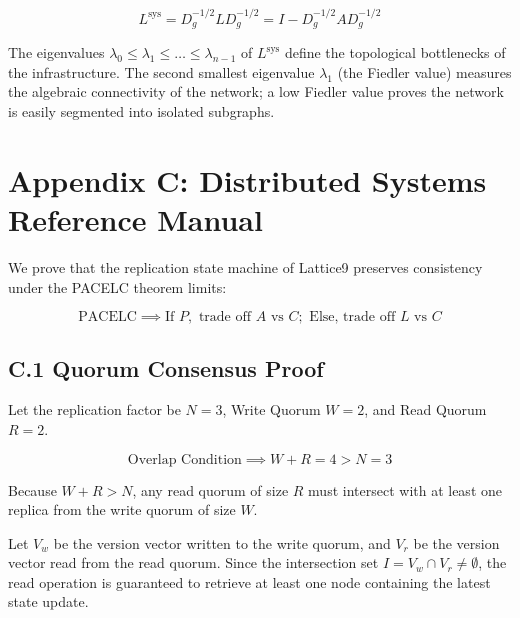 \documentclass[11pt,a4paper]{article}
\theoremstyle{definition}
\numberwithin{equation}{section}
\begin{document}
\begin{equation}\label{eq:norm-laplacian}
L^{\text{sys}} = D_g^{-1/2} L D_g^{-1/2} = I - D_g^{-1/2} A D_g^{-1/2}
\end{equation}

The eigenvalues $\lambda_0 \leq \lambda_1 \leq \dots \leq \lambda_{n-1}$ of $L^{\text{sys}}$ define the topological bottlenecks of the infrastructure. The second smallest eigenvalue $\lambda_1$ (the Fiedler value) measures the algebraic connectivity of the network; a low Fiedler value proves the network is easily segmented into isolated subgraphs.

\section*{Appendix C: Distributed Systems Reference Manual}

We prove that the replication state machine of Lattice9 preserves consistency under the PACELC theorem limits:

\begin{equation}\label{eq:pacelc}
\text{PACELC} \implies \text{If } P, \text{ trade off } A \text{ vs } C; \text{ Else, trade off } L \text{ vs } C
\end{equation}

\subsection*{C.1 Quorum Consensus Proof}

Let the replication factor be $N=3$, Write Quorum $W=2$, and Read Quorum $R=2$.

\begin{equation}\label{eq:overlap}
\text{Overlap Condition} \implies W + R = 4 > N = 3
\end{equation}

Because $W + R > N$, any read quorum of size $R$ must intersect with at least one replica from the write quorum of size $W$.

Let $V_w$ be the version vector written to the write quorum, and $V_r$ be the version vector read from the read quorum. Since the intersection set $I = V_w \cap V_r \neq \emptyset$, the read operation is guaranteed to retrieve at least one node containing the latest state update.
\end{document}
